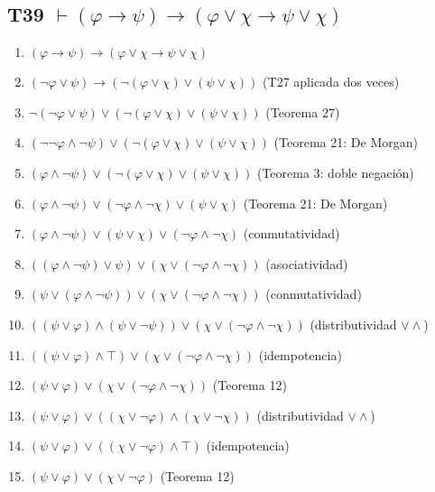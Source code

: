 \documentclass[a4paper,11pt]{article}
\begin{document}
\subsection{T39 $\vdash (\varphi \rightarrow \psi) \rightarrow (\varphi \lor \chi \rightarrow \psi \lor \chi)$}

\begin{enumerate}
    \item $(\varphi \rightarrow \psi) \rightarrow (\varphi \lor \chi \rightarrow \psi \lor \chi)$
    \item $(\neg\varphi \lor \psi) \rightarrow (\neg(\varphi \lor \chi) \lor (\psi \lor \chi))$ \hfill (T27 aplicada dos veces)
    \item $\neg(\neg\varphi \lor \psi) \lor (\neg(\varphi \lor \chi) \lor (\psi \lor \chi))$ \hfill (Teorema 27)
    \item $(\neg\neg\varphi \land \neg\psi) \lor (\neg(\varphi \lor \chi) \lor (\psi \lor \chi))$ \hfill (Teorema 21: De Morgan)
    \item $(\varphi \land \neg\psi) \lor (\neg(\varphi \lor \chi) \lor (\psi \lor \chi))$ \hfill (Teorema 3: doble negación)
    \item $(\varphi \land \neg\psi) \lor (\neg\varphi \land \neg\chi) \lor (\psi \lor \chi)$ \hfill (Teorema 21: De Morgan)
    \item $(\varphi \land \neg\psi) \lor (\psi \lor \chi) \lor(\neg\varphi \land \neg\chi) $ \hfill (conmutatividad)
    \item $((\varphi \land \neg\psi) \lor \psi) \lor (\chi \lor(\neg\varphi \land \neg\chi)) $ \hfill (asociatividad)
    \item $(\psi \lor (\varphi \land \neg\psi)) \lor (\chi \lor(\neg\varphi \land \neg\chi)) $ \hfill (conmutatividad)
    \item $((\psi \lor \varphi) \land (\psi \lor \neg\psi)) \lor (\chi \lor(\neg\varphi \land \neg\chi)) $ \hfill (distributividad $\lor\land$)
    \item $((\psi \lor \varphi) \land \top) \lor (\chi \lor(\neg\varphi \land \neg\chi)) $ \hfill (idempotencia)
    \item $(\psi \lor \varphi) \lor (\chi \lor(\neg\varphi \land \neg\chi)) $ \hfill (Teorema 12)
    \item $(\psi \lor \varphi) \lor ((\chi \lor \neg\varphi) \land (\chi \lor \neg\chi)) $ \hfill (distributividad $\lor\land$)
    \item $(\psi \lor \varphi) \lor ((\chi \lor \neg\varphi) \land \top) $ \hfill (idempotencia)
    \item $(\psi \lor \varphi) \lor (\chi \lor \neg\varphi) $ \hfill (Teorema 12)

\end{enumerate}
\end{document}
